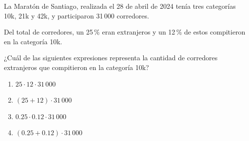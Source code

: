 \begin{problem}
    La Maratón de Santiago, realizada el 28 de abril de 2024 tenía tres categorías 10k, 21k y 42k, y participaron 31\,000 corredores.

    Del total de corredores, un 25\,\% eran extranjeros y un 12\,\% de estos compitieron en la categoría 10k.

    ¿Cuál de las siguientes expresiones representa la cantidad de corredores extranjeros que compitieron en la categoría 10k?

    \begin{enumerate}[label=\Alph*.]
        \item $25 \cdot 12 \cdot 31\,000$
        \item $(25 + 12) \cdot 31\,000$
        \item $0.25 \cdot 0.12 \cdot 31\,000$
        \item $(0.25 + 0.12) \cdot 31\,000$
    \end{enumerate}
\end{problem}
